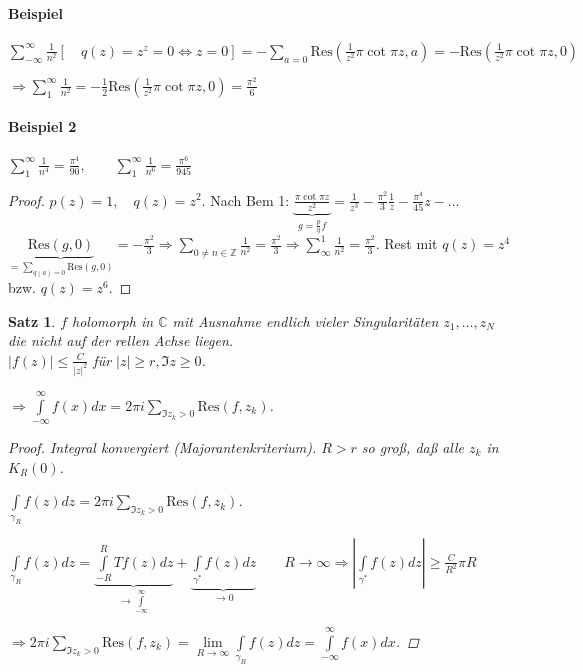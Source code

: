 \documentclass[ngerman,halfparskip]{scrartcl}
\newtheorem{satz}{Satz}[section]
\theoremstyle{definition}
\def\C{\mathbb C}
\def\Z{\mathbb Z}
\def\Res{\text{Res}}
\begin{document}
\paragraph{Beispiel}$\sum\limits_{-\infty}^\infty \frac 1{n^2} [\quad q(z)=z^z=0\Leftrightarrow z=0] =-\sum\limits_{a=0}\Res(\frac 1{z^2}\pi\cot\pi z,a)=-\Res(\frac 1{z^2}\pi\cot\pi z,0)$

$\Rightarrow \sum\limits_1^\infty \frac 1{n^2}=-\frac 12 \Res (\frac 1 {z^2}\pi\cot\pi z,0)=\frac {\pi^2}6$

\paragraph{Beispiel 2} $\sum\limits_1^\infty\frac 1{n^4}=\frac {\pi^4}{90}, \qquad \sum\limits_1^\infty\frac 1{n^6}=\frac {\pi^6}{945}$
\begin{proof}
$p(z)=1, \quad q(z)=z^2.$ Nach Bem 1: $\underbrace{\frac{\pi\cot\pi z}{z^2}}_{g=\frac pqf}=\frac 1{z^3}-\frac {\pi^2}3\frac 1z -\frac {\pi^4}{45}z -\ldots$\\
$\underbrace{\Res(g,0)}_{=\sum\limits_{q(a)=0}\Res(g,0)}=-\frac{\pi^2}{3}\Rightarrow \sum\limits_{0\neq n\in\Z}\frac 1 {n^2}=\frac {\pi^2}3 \Rightarrow\sum\limits^1_{\infty}\frac 1 {n^2}=\frac {\pi^2}3$. Rest mit $q(z)=z^4$ bzw. $q(z)=z^6$.
\end{proof}

\begin{satz}
$f$ holomorph in $\C$ mit Ausnahme endlich vieler Singularitäten $z_1,\ldots,z_N$ die nicht auf der rellen Achse liegen. \\
$|f(z)|\leq \frac C{|z|^2}$ für $|z|\geq r, \Im z\geq 0$.

$\Rightarrow \int\limits_{-\infty}^\infty f(x)dx=2\pi i \sum\limits_{\Im z_k >0}\Res (f,z_k)$.

\begin{proof}
Integral konvergiert (Majorantenkriterium). $R>r$ so groß, daß alle $z_k$ in $K_R(0)$. 

$\int\limits_{\gamma_R} f(z)dz= 2\pi i \sum\limits_{\Im z_k >0}\Res (f,z_k)$.

$\int\limits_{\gamma_R} f(z)dz=\underbrace{\int\limits_{-R}^RT f(z)dz}_{\rightarrow\int\limits_{-\infty}^\infty}+\underbrace{\int\limits_{\gamma^*} f(z)dz}_{\rightarrow 0} \qquad R\rightarrow \infty \Rightarrow |\int\limits_{\gamma^*} f(z)dz|\geq \frac C{R^2}\pi R$

$\Rightarrow 2\pi i \sum\limits_{\Im z_k>0}\Res(f,z_k)=\lim\limits_{R\rightarrow \infty } \int\limits_{\gamma_R}f(z)dz=\int\limits_{-\infty}^\infty f(x)dx$.

\end{proof}

\end{satz}
\end{document}

